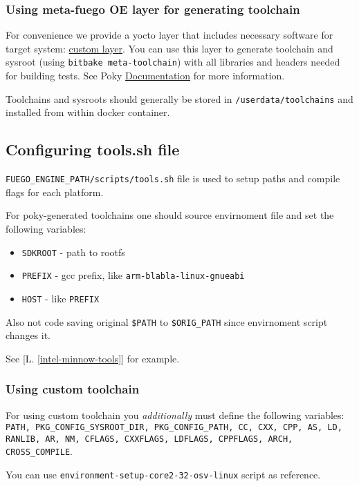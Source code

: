 \subsubsection{Using meta-fuego OE layer for generating toolchain}
For convenience we provide a yocto layer that includes necessary software for target system: \href{https://bitbucket.org/cogentembedded/meta-fuego/}{custom layer}. You can use this layer to generate toolchain and sysroot (using \texttt{bitbake meta-toolchain}) with all libraries and headers needed for building tests. See Poky \href{http://www.yoctoproject.org/docs/1.6/adt-manual/adt-manual.html}{Documentation} for more information.

Toolchains and sysroots should generally be stored in \texttt{/userdata/toolchains} and installed from within docker container.

\subsection{Configuring tools.sh file}
\texttt{FUEGO\_ENGINE\_PATH/scripts/tools.sh} file is used to setup paths and compile flags for each platform.

For poky-generated toolchains one should source envirnoment file and set the following variables:
\begin{itemize}
\item \texttt{SDKROOT} - path to rootfs
\item \texttt{PREFIX} - gcc prefix, like \texttt{arm-blabla-linux-gnueabi}
\item \texttt{HOST} - like \texttt{PREFIX}
\end{itemize}

Also not code saving original \texttt{\$PATH} to \texttt{\$ORIG\_PATH} since envirnoment script changes it.

See [L. \ref{intel-minnow-tools}] for example.

\subsubsection{Using custom toolchain}
\label {subsec:custom-toolchain-tools-sh}

For using custom toolchain you \emph{additionally} must define the following variables: \texttt{PATH, PKG\_CONFIG\_SYSROOT\_DIR, PKG\_CONFIG\_PATH, CC, CXX, CPP, AS, LD, RANLIB, AR, NM, CFLAGS, CXXFLAGS, LDFLAGS, CPPFLAGS, ARCH, CROSS\_COMPILE}.

You can use \texttt{environment-setup-core2-32-osv-linux} script as reference.

